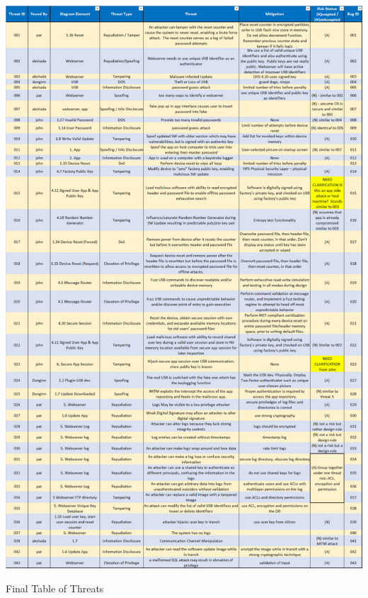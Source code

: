 \begin{table}
\centering
  \includegraphics[width=\linewidth]{threat_list_final}
  \caption{Final Table of Threats}
  \label{tab:threatlist}
\end{table}